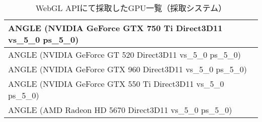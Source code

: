 \begin{table}[h]
    \begin{center}
    \caption{WebGL APIにて採取したGPU一覧（採取システム）}
    \label{tb-gpu_rst}
        \begin{tabularx}{\linewidth}{|X|} \hline
            ANGLE (NVIDIA GeForce GTX 750 Ti Direct3D11 vs\_5\_0 ps\_5\_0) \\ \hline
            ANGLE (NVIDIA GeForce GT 520 Direct3D11 vs\_5\_0 ps\_5\_0) \\ \hline
            ANGLE (NVIDIA GeForce GTX 960 Direct3D11 vs\_5\_0 ps\_5\_0) \\ \hline
            ANGLE (NVIDIA GeForce GTX 550 Ti Direct3D11 vs\_5\_0 ps\_5\_0) \\ \hline
            ANGLE (AMD Radeon HD 5670 Direct3D11 vs\_5\_0 ps\_5\_0) \\ \hline
        \end{tabularx}
    \end{center}
\end{table}